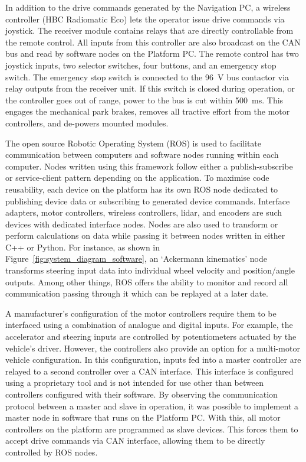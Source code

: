 \documentclass[preprint,authoryear,12pt]{elsarticle}
\begin{document}
        In addition to the drive commands generated by the Navigation PC, a wireless controller (HBC Radiomatic Eco) lets the operator issue drive commands via joystick.
        The receiver module contains relays that are directly controllable from the remote control.
        All inputs from this controller are also broadcast on the CAN bus and read by software nodes on the Platform PC.
        The remote control has two joystick inputs, two selector switches, four buttons, and an emergency stop switch.
        The emergency stop switch is connected to the \SI{96}{\volt} bus contactor via relay outputs from the receiver unit.
        If this switch is closed during operation, or the controller goes out of range, power to the bus is cut within \SI{500}{\milli\second}.
        This engages the mechanical park brakes, removes all tractive effort from the motor controllers, and de-powers mounted modules.

        The open source Robotic Operating System (ROS) is used to facilitate communication between computers and software nodes running within each computer.
        Nodes written using this framework follow either a publish-subscribe or service-client pattern depending on the application.
        To maximise code reusability, each device on the platform has its own ROS node dedicated to publishing device data or subscribing to generated device commands.
        Interface adapters, motor controllers, wireless controllers, lidar, and encoders are such devices with dedicated interface nodes.
        Nodes are also used to transform or perform calculations on data while passing it between nodes written in either C++ or Python.
        For instance, as shown in Figure~\ref{fig:system_diagram_software}, an `Ackermann kinematics' node transforms steering input data into individual wheel velocity and position/angle outputs.
        Among other things, ROS offers the ability to monitor and record all communication passing through it which can be replayed at a later date.

        A manufacturer's configuration of the motor controllers require them to be interfaced using a combination of analogue and digital inputs.
        For example, the accelerator and steering inputs are controlled by potentiometers actuated by the vehicle's driver.
        However, the controllers also provide an option for a multi-motor vehicle configuration.
        In this configuration, inputs fed into a master controller are relayed to a second controller over a CAN interface.
        This interface is configured using a proprietary tool and is not intended for use other than between controllers configured with their software.
        By observing the communication protocol between a master and slave in operation, it was possible to implement a master node in software that runs on the Platform PC.
        With this, all motor controllers on the platform are programmed as slave devices.
        This forces them to accept drive commands via CAN interface, allowing them to be directly controlled by ROS nodes.
\end{document}
